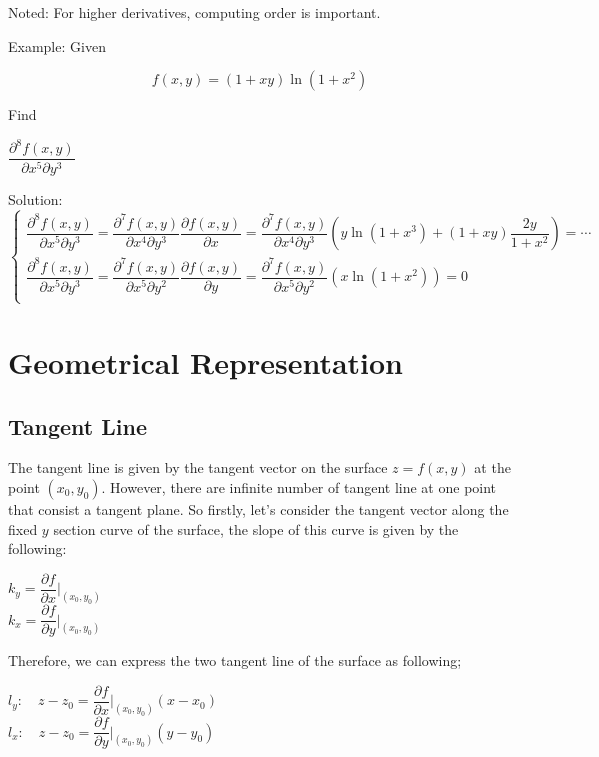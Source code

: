 \documentclass[UTF8,a4paper, 10pt, openany]{svmono}
\begin{document}
Noted: For higher derivatives, computing order is important.

Example: Given

\[f(x,y)=(1+xy)\ln (1+x^2)\]

Find
\begin{center}
$\dfrac{\partial^{8}f(x,y)}{\partial x^5 \partial y^3}$
\end{center}

Solution:
\[\begin{cases}
\dfrac{\partial^{8}f(x,y)}{\partial x^5 \partial y^3}=\dfrac{\partial^{7}f(x,y)}{\partial x^4 \partial y^3}\dfrac{\partial f(x,y)}{\partial x}=\dfrac{\partial^{7}f(x,y)}{\partial x^4 \partial y^3}(y\ln (1+x^3)+(1+xy)\dfrac{2y}{1+x^2})=\cdots \\
\dfrac{\partial^{8}f(x,y)}{\partial x^5 \partial y^3}=\dfrac{\partial^{7}f(x,y)}{\partial x^5 \partial y^2}\dfrac{\partial f(x,y)}{\partial y}=\dfrac{\partial^{7}f(x,y)}{\partial x^5 \partial y^2}(x\ln (1+x^2))=0 \\
  \end{cases}\]

\section{Geometrical Representation}
\subsection{Tangent Line}
The tangent line is given by the tangent vector on the surface $z=f(x,y)$ at the point $(x_0,y_0)$. However, there are infinite number of tangent line at one point that consist a tangent plane. So firstly, let's consider the tangent vector along the fixed $y$ section curve of the surface, the slope of this curve is given by the following:

\begin{center}
$k_y=\dfrac{\partial f}{\partial x}|_{(x_0,y_0)}$\\
$k_x=\dfrac{\partial f}{\partial y}|_{(x_0,y_0)}$
\end{center}

Therefore, we can express the two tangent line of the surface as following;

\begin{center}
$l_{y}: \quad z-z_0=\dfrac{\partial f}{\partial x}|_{(x_0,y_0)}(x-x_0)$\\
$l_{x}: \quad z-z_0=\dfrac{\partial f}{\partial y}|_{(x_0,y_0)}(y-y_0)$
\end{center}
\end{document}

